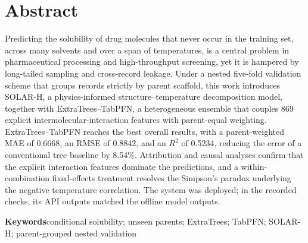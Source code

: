 \section*{Abstract}
Predicting the solubility of drug molecules that never occur in the training set, across many solvents and over a span of temperatures, is a central problem in pharmaceutical processing and high-throughput screening, yet it is hampered by long-tailed sampling and cross-record leakage. Under a nested five-fold validation scheme that groups records strictly by parent scaffold, this work introduces SOLAR-H, a physics-informed structure--temperature decomposition model, together with ExtraTrees--TabPFN, a heterogeneous ensemble that couples 869 explicit intermolecular-interaction features with parent-equal weighting. ExtraTrees--TabPFN reaches the best overall results, with a parent-weighted MAE of 0.6668, an RMSE of 0.8842, and an $R^2$ of 0.5234, reducing the error of a conventional tree baseline by 8.54\%. Attribution and causal analyses confirm that the explicit interaction features dominate the predictions, and a within-combination fixed-effects treatment resolves the Simpson's paradox underlying the negative temperature correlation. The system was deployed; in the recorded checks, its API outputs matched the offline model outputs.

\noindent\textbf{Keywords}\quad conditional solubility; unseen parents; ExtraTrees; TabPFN; SOLAR-H; parent-grouped nested validation

